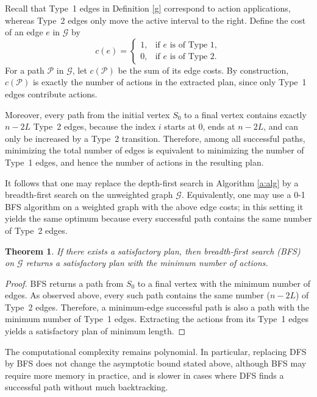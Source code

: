 \documentclass[]{jair}
\newtheorem{Theorem}{Theorem}
\begin{document}
Recall that Type~1 edges in Definition \ref{g} correspond to action applications, whereas
Type~2 edges only move the active interval to the right.
Define the cost of an edge $e$ in $\mathcal{G}$ by
\[
c(e)=
\begin{cases}
1, & \text{if $e$ is of Type~1},\\
0, & \text{if $e$ is of Type~2}.
\end{cases}
\]
For a path $\mathcal{P}$ in $\mathcal{G}$, let $c(\mathcal{P})$ be the sum of its edge costs.
By construction, $c(\mathcal{P})$ is exactly the number of actions in the extracted plan,
since only Type~1 edges contribute actions.

Moreover, every path from the initial vertex $S_0$ to a final vertex contains exactly
$n-2L$ Type~2 edges, because the index $i$ starts at $0$, ends at $n-2L$, and can only be
increased by a Type~2 transition. Therefore, among all successful paths, minimizing the total
number of edges is equivalent to minimizing the number of Type~1 edges, and hence the number
of actions in the resulting plan.

It follows that one may replace the depth-first search in Algorithm \ref{a:alg} by a
breadth-first search on the unweighted graph $\mathcal{G}$. 
Equivalently, one may use a 0-1 BFS algorithm on a weighted graph with the above edge costs; in this setting it yields the same optimum because every successful path contains the same number of Type~2 edges.

\begin{Theorem}\label{t:shortest}
    If there exists a satisfactory plan, then breadth-first search (BFS) on $\mathcal{G}$ returns a
satisfactory plan with the minimum number of actions.
\end{Theorem}

\begin{proof}{}
BFS returns a path from $S_0$ to a final vertex with the minimum number of
edges. As observed above, every such path contains the same number ($n-2L$) of Type~2 edges.
Therefore, a minimum-edge successful path is also a path with the minimum number of Type~1 edges.
Extracting the actions from its Type~1 edges yields a satisfactory plan of minimum length.
\end{proof}

The computational complexity remains polynomial. In particular, replacing DFS by BFS
does not change the asymptotic bound stated above, although BFS may require more memory in practice,
and is slower in cases where DFS finds a successful path without much backtracking.
\end{document}
